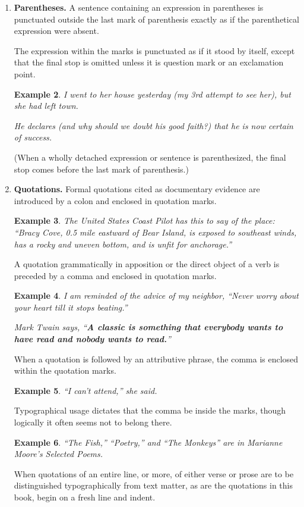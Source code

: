 \documentclass{book}
\numberwithin{equation}{section}
\newtheorem{remark}{Remark}[chapter]
\newtheorem{example}{Example}[chapter]
\begin{document}
\begin{enumerate}
\begin{remark}[Exception]
\begin{example}
            ``Read Chapter Twelve.''
        \end{example}
    \end{remark}
    \item \textbf{Parentheses.} A sentence containing an expression in parentheses is punctuated outside the last mark of parenthesis exactly as if the parenthetical expression were absent.
    
    The expression within the marks is punctuated as if it stood by itself, except that the final stop is omitted unless it is question mark or an exclamation point.
    \begin{example}
        I went to her house yesterday (my 3rd attempt to see her), but she had left town.
        
        He declares (and why should we doubt his good faith?) that he is now certain of success.
    \end{example}
    (When a wholly detached expression or sentence is parenthesized, the final stop comes before the last mark of parenthesis.)
    \item \textbf{Quotations.} Formal quotations cited as documentary evidence are introduced by a colon and enclosed in quotation marks.
    \begin{example}
        The United States Coast Pilot has this to say of the place: ``Bracy Cove, 0.5 mile eastward of Bear Island, is exposed to southeast winds, has a rocky and uneven bottom, and is unfit for anchorage.''
    \end{example}
    A quotation grammatically in apposition or the direct object of a verb is preceded by a comma and enclosed in quotation marks.
    \begin{example}
        I am reminded of the advice of my neighbor, ``Never worry about your heart till it stops beating.''
        
        Mark Twain says, ``\textbf{A classic is something that everybody wants to have read and nobody wants to read.}''
    \end{example}
    When a quotation is followed by an attributive phrase, the comma is enclosed within the quotation marks.
    \begin{example}
        ``I can't attend,'' she said.
    \end{example}
    Typographical usage dictates that the comma be inside the marks, though logically it often seems not to belong there.
    \begin{example}
        ``The Fish,'' ``Poetry,'' and ``The Monkeys'' are in Marianne Moore's Selected Poems.
    \end{example}
    When quotations of an entire line, or more, of either verse or prose are to be distinguished typographically from text matter, as are the quotations in this book, begin on a fresh line and indent.
    

\end{enumerate}
\end{document}
